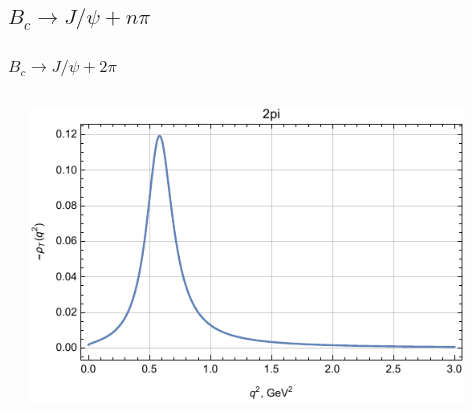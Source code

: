 \documentclass{beamer}
\begin{document}
\subsection{$B_c\to J/\psi + n\pi$}
\begin{frame}
  \frametitle{$B_c\to J/\psi+ 2\pi$}
  \begin{columns}
    \begin{column}{0.5\textwidth}
    \end{column}
    \begin{column}{0.5\textwidth}
  \includegraphics[width=0.9\textwidth]{figs/rhoT_2pi_q2}
    \end{column}
  \end{columns}
\end{frame}
\end{document}
